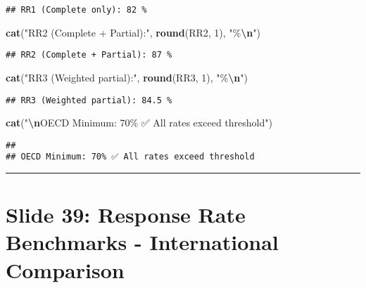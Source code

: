 \documentclass[
]{article}
\newenvironment{Shaded}{\begin{snugshade}}{\end{snugshade}}
\newcommand{\DecValTok}[1]{\textcolor[rgb]{0.00,0.00,0.81}{#1}}
\newcommand{\FunctionTok}[1]{\textcolor[rgb]{0.13,0.29,0.53}{\textbf{#1}}}
\newcommand{\NormalTok}[1]{#1}
\newcommand{\SpecialCharTok}[1]{\textcolor[rgb]{0.81,0.36,0.00}{\textbf{#1}}}
\newcommand{\StringTok}[1]{\textcolor[rgb]{0.31,0.60,0.02}{#1}}
\begin{document}
\begin{verbatim}
## RR1 (Complete only): 82 %
\end{verbatim}

\begin{Shaded}
\begin{Highlighting}[]
\FunctionTok{cat}\NormalTok{(}\StringTok{"RR2 (Complete + Partial):"}\NormalTok{, }\FunctionTok{round}\NormalTok{(RR2, }\DecValTok{1}\NormalTok{), }\StringTok{"\%}\SpecialCharTok{\textbackslash{}n}\StringTok{"}\NormalTok{)}
\end{Highlighting}
\end{Shaded}

\begin{verbatim}
## RR2 (Complete + Partial): 87 %
\end{verbatim}

\begin{Shaded}
\begin{Highlighting}[]
\FunctionTok{cat}\NormalTok{(}\StringTok{"RR3 (Weighted partial):"}\NormalTok{, }\FunctionTok{round}\NormalTok{(RR3, }\DecValTok{1}\NormalTok{), }\StringTok{"\%}\SpecialCharTok{\textbackslash{}n}\StringTok{"}\NormalTok{)}
\end{Highlighting}
\end{Shaded}

\begin{verbatim}
## RR3 (Weighted partial): 84.5 %
\end{verbatim}

\begin{Shaded}
\begin{Highlighting}[]
\FunctionTok{cat}\NormalTok{(}\StringTok{"}\SpecialCharTok{\textbackslash{}n}\StringTok{OECD Minimum: 70\% ✅ All rates exceed threshold"}\NormalTok{)}
\end{Highlighting}
\end{Shaded}

\begin{verbatim}
## 
## OECD Minimum: 70% ✅ All rates exceed threshold
\end{verbatim}

\begin{center}\rule{0.5\linewidth}{0.5pt}\end{center}

\section{Slide 39: Response Rate Benchmarks - International
Comparison}\label{slide-39-response-rate-benchmarks---international-comparison}
\end{document}
